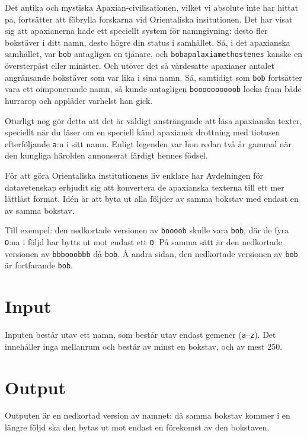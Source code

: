 
Det antika och mystiska Apaxian-civilisationen, vilket vi absolute inte har hittat på,
fortsätter att föbrylla forskarna vid Orientaliska insitutionen. Det har visat sig att
apaxianerna hade ett speciellt system för namngivning: desto fler bokstäver i ditt namn,
desto högre din status i samhället. Så, i det apaxianska samhället, var \texttt{bob}
antagligen en tjänare, och \texttt{bobapalaxiamethostenes} kanske en översterpäst eller
minister. Och utöver det så värdesatte apaxianer antalet angränsande bokstäver som var
lika i sina namn. Så, samtidigt som \texttt{bob} fortsätter vara ett oimponerande namn,
så kunde antagligen \texttt{boooooooooob} locka fram både hurrarop och applåder
varhelst han gick.

Oturligt nog gör detta att det är väldigt ansträngande att läsa apaxianska texter,
speciellt när du läser om en speciell känd apaxiansk drottning med tiotusen efterföljande
\texttt{a}:n i sitt namn. Enligt legenden var hon redan två år gammal när den kungliga
härolden annonserat färdigt hennes födsel.

För att göra Orientaliska institutionens liv enklare har Avdelningen för datavetenskap 
erbjudit sig att konvertera de apaxianska texterna till ett mer lättläst format. Idén
är att byta ut alla följder av samma bokstav med endast en av samma bokstav.

Till exempel: den nedkortade versionen av \texttt{boooob} skulle vara \texttt{bob}, 
där de fyra \texttt{O}:na i följd har bytts ut mot endast ett \texttt{O}. På samma sätt
är den nedkortade versionen av \texttt{bbbooobbb} då \texttt{bob}. Å andra sidan, den
nedkortade versionen av \texttt{bob} är fortfarande \texttt{bob}.

\section*{Input}

Inputen består utav ett namn, som består utav endast gemener (\texttt{a}--\texttt{z}).
Det innehåller inga mellanrum och består av minst en bokstav, och av mest 250.

\section*{Output}

Outputen är en nedkortad version av namnet: då samma bokstav kommer i en längre följd
ska den bytas ut mot endast en förekomst av den bokstaven.
